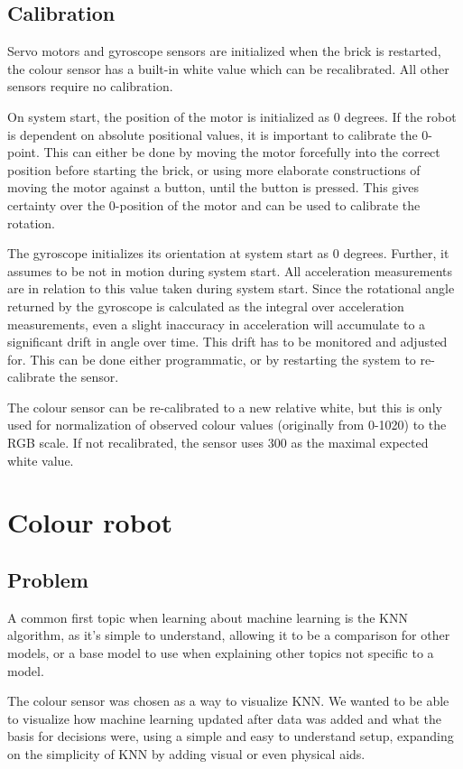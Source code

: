 \documentclass[11pt, a4paper]{article}
\begin{document}
\subsection{Calibration} \label{calibration}
Servo motors and gyroscope sensors are initialized when the brick is restarted, the colour sensor has a built-in white value which can be recalibrated. All other sensors require no calibration.

On system start, the position of the motor is initialized as 0 degrees. If the robot is dependent on absolute positional values, it is important to calibrate the 0-point. This can either be done by moving the motor forcefully into the correct position before starting the brick, or using more elaborate constructions of moving the motor against a button, until the button is pressed. This gives certainty over the 0-position of the motor and can be used to calibrate the rotation.

The gyroscope initializes its orientation at system start as 0 degrees. Further, it assumes to be not in motion during system start. All acceleration measurements are in relation to this value taken during system start. Since the rotational angle returned by the gyroscope is calculated as the integral over acceleration measurements, even a slight inaccuracy in acceleration will accumulate to a significant drift in angle over time. This drift has to be monitored and adjusted for. This can be done either programmatic, or by restarting the system to re-calibrate the sensor.

The colour sensor can be re-calibrated to a new relative white, but this is only used for normalization of observed colour values (originally from 0-1020) to the RGB scale. If not recalibrated, the sensor uses 300 as the maximal expected white value.

\pagebreak
\section{Colour robot}
\subsection{Problem}
A common first topic when learning about machine learning is the KNN algorithm, as it's simple to understand, allowing it to be a comparison for other models, or a base model to use when explaining other topics not specific to a model.

The colour sensor was chosen as a way to visualize KNN. We wanted to be able to visualize how machine learning updated after data was added and what the basis for decisions were, using a simple and easy to understand setup, expanding on the simplicity of KNN by adding visual or even physical aids.
\end{document}
